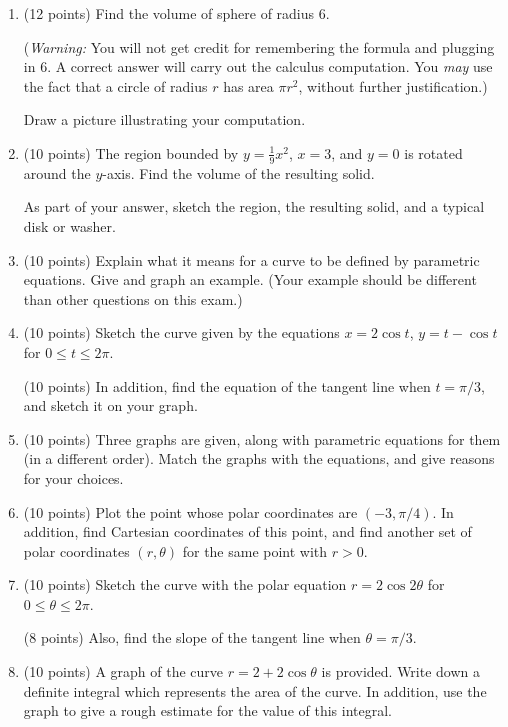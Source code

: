 \documentclass[12pt]{article}
\begin{document}
\begin{enumerate}[(1)]
\item
(12 points) Find the volume of sphere of radius $6$.

({\itshape Warning:} You will not get credit for remembering the formula
and plugging in $6$. A correct answer will carry out the calculus
computation. You {\itshape may} use the fact that a circle of radius $r$ has
area $\pi r^2$, without further justification.)

Draw a picture illustrating your computation.

\item
(10 points) The region bounded by $y = \frac{1}{9} x^2$, $x = 3$, and $y = 0$ 
is rotated around the
$y$-axis. Find the volume of the resulting solid.

As part of your answer, sketch the region, the resulting solid, and a typical disk or washer.

\item
(10 points) Explain what it means for a curve to be defined by parametric equations. Give and graph
an example. (Your example should be different than other questions on this exam.)

\item
(10 points) Sketch the curve given by the equations $x = 2 \cos t$, $y = t - \cos t$ for $0 \leq t \leq 2\pi$.

(10 points) In addition, find the equation of the tangent line when $t = \pi/3$, and sketch it on your graph.

\item
(10 points) Three graphs are given, along with parametric equations for them (in a different order). 
Match the graphs with the equations,
and give reasons for your choices.
\item
(10 points) Plot the point whose polar coordinates are $(-3, \pi/4)$. In addition, find Cartesian
coordinates of this point, and find another set of polar coordinates $(r, \theta)$ for the
same point with $r > 0$.
\item
(10 points) Sketch the curve with the polar equation $r = 2 \cos 2 \theta$ for $0 \leq \theta \leq 2 \pi$.

(8 points) Also, find the slope of the
tangent line when $\theta = \pi/3$.

\item
(10 points) A graph of the curve $r = 2 + 2 \cos \theta$ is provided. Write down a definite integral
which represents the area of the curve. In addition, use the graph to give a rough estimate for the value of this
integral.

\end{enumerate}
\end{document}
